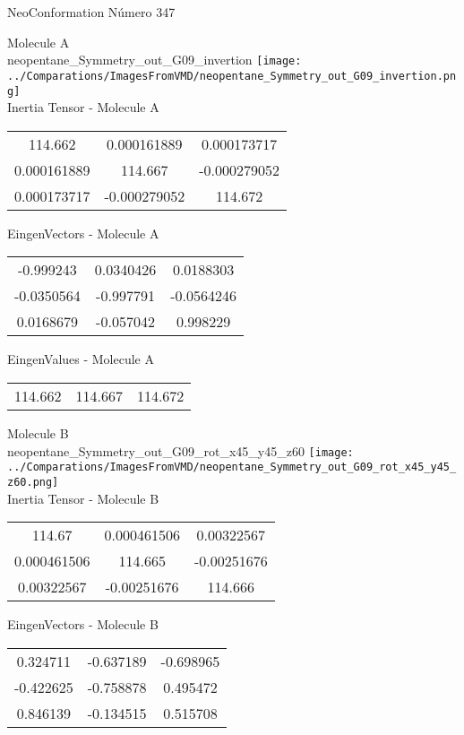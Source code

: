 \vtab[-2cm]
\begin{center}
{\large NeoConformation \tab Número 347}
\end{center}
\begin{multicols}{2}
\begin{center}

Molecule A \\ 
neopentane\_Symmetry\_out\_G09\_invertion
\texttt{[image: ../Comparations/ImagesFromVMD/neopentane\_Symmetry\_out\_G09\_invertion.png]}
\\
Inertia Tensor - Molecule A \\
\vtab

\begin{tabular}{|c c c|}
114.662	 & 	0.000161889	 & 	0.000173717	 \\
0.000161889	 & 	114.667	 & 	-0.000279052	 \\
0.000173717	 & 	-0.000279052	 & 	114.672
\end{tabular}

\vtab
 EingenVectors - Molecule A     \\
\vtab
\begin{tabular}{|c c c|}
-0.999243	 & 	0.0340426	 & 	0.0188303	 \\
-0.0350564	 & 	-0.997791	 & 	-0.0564246	 \\
0.0168679	 & 	-0.057042	 & 	0.998229
\end{tabular}

\vtab
 EingenValues - Molecule A     \\
\vtab
\begin{tabular}{|c c c|}
114.662	 & 	114.667	 & 	114.672	 \\
\end{tabular}
\columnbreak

Molecule B \\ 
neopentane\_Symmetry\_out\_G09\_rot\_x45\_y45\_z60
\texttt{[image: ../Comparations/ImagesFromVMD/neopentane\_Symmetry\_out\_G09\_rot\_x45\_y45\_z60.png]}
\\
Inertia Tensor - Molecule B \\
\vtab

\begin{tabular}{|c c c|}
114.67	 & 	0.000461506	 & 	0.00322567	 \\
0.000461506	 & 	114.665	 & 	-0.00251676	 \\
0.00322567	 & 	-0.00251676	 & 	114.666
\end{tabular}

\vtab
 EingenVectors - Molecule B     \\
\vtab
\begin{tabular}{|c c c|}
0.324711	 & 	-0.637189	 & 	-0.698965	 \\
-0.422625	 & 	-0.758878	 & 	0.495472	 \\
0.846139	 & 	-0.134515	 & 	0.515708
\end{tabular}


\end{center}
\end{multicols}
